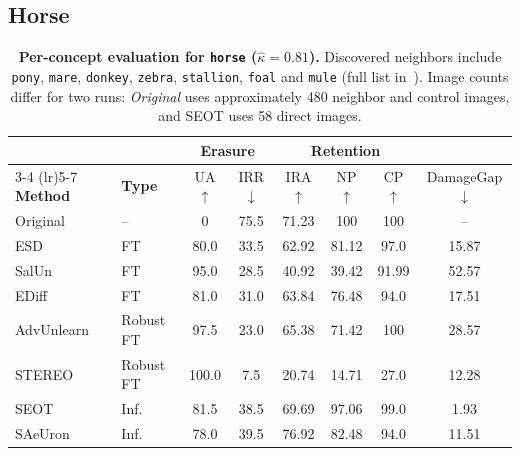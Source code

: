 \subsection{Horse}
\label{app:per_concept_horse}

\begin{table}[ht]
\centering
\small
\setlength{\tabcolsep}{5pt}
\begin{tabular}{llcccccc}
\toprule
& & \multicolumn{2}{c}{\textbf{Erasure}} & \multicolumn{3}{c}{\textbf{Retention}} & \\
\cmidrule(lr){3-4} \cmidrule(lr){5-7}
\textbf{Method} & \textbf{Type} & UA$\uparrow$ & IRR$\downarrow$ & IRA$\uparrow$ & NP$\uparrow$ & CP$\uparrow$ & DamageGap$\downarrow$ \\
\midrule
Original    & --          & 0     & 75.5  & 71.23 & 100   & 100   & --    \\
\midrule
ESD         & FT          & 80.0  & 33.5  & 62.92 & 81.12 & 97.0  & 15.87 \\
SalUn       & FT          & 95.0  & 28.5  & 40.92 & 39.42 & 91.99 & 52.57 \\
EDiff       & FT          & 81.0  & 31.0  & 63.84 & 76.48 & 94.0  & 17.51 \\
\midrule
AdvUnlearn  & Robust FT   & 97.5  & 23.0  & 65.38 & 71.42 & 100   & 28.57 \\
STEREO      & Robust FT   & 100.0 & 7.5   & 20.74 & 14.71 & 27.0  & 12.28 \\
\midrule
SEOT        & Inf.        & 81.5  & 38.5  & 69.69 & 97.06 & 99.0  & 1.93  \\
SAeUron     & Inf.        & 78.0  & 39.5  & 76.92 & 82.48 & 94.0  & 11.51 \\
\bottomrule
\end{tabular}
\caption{\textbf{Per-concept evaluation for \texttt{horse} ($\hat\kappa = 0.81$).} Discovered neighbors include 
\texttt{pony}, \texttt{mare}, \texttt{donkey}, \texttt{zebra}, \texttt{stallion}, \texttt{foal} and \texttt{mule} (full list in~). Image counts differ for two runs: \emph{Original} uses approximately 480 neighbor and control images, and SEOT uses 58 direct images.}
\label{tab:per_concept_horse}
\end{table}

